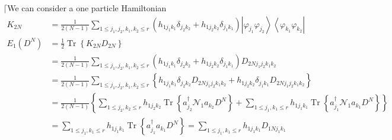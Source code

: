 \documentclass[aps,preprint]{revtex4}%
\begin{document}
$\lceil$We can consider a one particle Hamiltonian
\begin{align}
K_{2N}  &  =\frac{1}{2\left(  N-1\right)  }\sum_{1\leq j_{1},j_{2},k_{1}%
,k_{2}\leq r}\left(  h_{1j_{1}k_{1}}\delta_{j_{2}k_{2}}+h_{1j_{2}k_{2}}%
\delta_{j_{1}k_{1}}\right)  \left\vert \varphi_{j_{1}}\varphi_{j_{2}%
}\right\rangle \left\langle \varphi_{k_{1}}\varphi_{k_{2}}\right\vert
\nonumber\\
E_{1}\left(  D^{N}\right)   &  =\frac{1}{2}\operatorname{Tr}\left\{
K_{2N}D_{2N}\right\} \nonumber\\
&  =\frac{1}{2\left(  N-1\right)  }\sum_{1\leq j_{1},j_{2},k_{1},k_{2}\leq
r}\left(  h_{1j_{1}k_{1}}\delta_{j_{2}k_{2}}+h_{1j_{2}k_{2}}\delta_{j_{1}%
k_{1}}\right)  D_{2Nj_{1}j_{2}k_{1}k_{2}}\nonumber\\
&  =\frac{1}{2\left(  N-1\right)  }\sum_{1\leq j_{1},j_{2},k_{1},k_{2}\leq
r}\left\{  h_{1j_{1}k_{1}}\delta_{j_{2}k_{2}}D_{2Nj_{1}j_{2}k_{1}k_{2}%
}+h_{1j_{2}k_{2}}\delta_{j_{1}k_{1}}D_{2Nj_{1}j_{2}k_{1}k_{2}}\right\}
\nonumber\\
&  =\frac{1}{2\left(  N-1\right)  }\left\{  \sum_{1\leq j_{2},k_{2}\leq
r}h_{1j_{2}k_{2}}\operatorname{Tr}\left\{  a_{j_{2}}^{\dagger}\mathcal{N}%
_{1}a_{k_{2}}D^{N}\right\}  +\sum_{1\leq j_{1},k_{1}\leq r}h_{1j_{1}k_{1}%
}\operatorname{Tr}\left\{  a_{j_{1}}^{\dagger}\mathcal{N}_{1}a_{k_{1}}%
D^{N}\right\}  \right\} \nonumber\\
&  =\sum_{1\leq j_{1},k_{1}\leq r}h_{1j_{1}k_{1}}\operatorname{Tr}\left\{
a_{j_{1}}^{\dagger}a_{k_{1}}D^{N}\right\}  =\sum_{1\leq j_{1},k_{1}\leq
r}h_{1j_{1}k_{1}}D_{1Nj_{1}k_{1}}%
\end{align}
\end{document}
